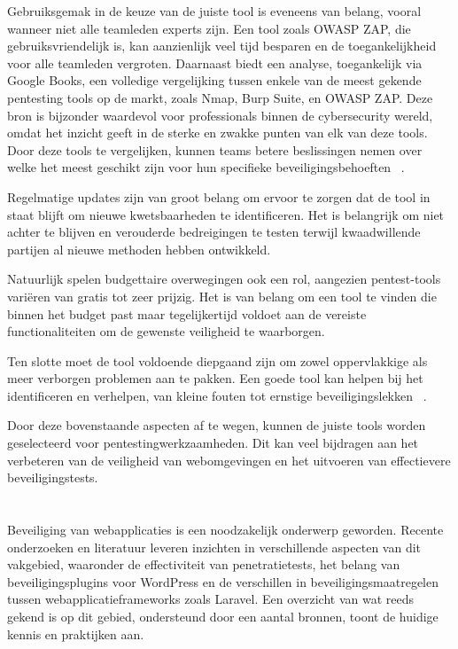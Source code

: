 Gebruiksgemak in de keuze van de juiste tool is eveneens van belang, vooral wanneer niet alle teamleden experts zijn. Een tool zoals OWASP ZAP, 
die gebruiksvriendelijk is, kan aanzienlijk veel tijd besparen en de toegankelijkheid voor alle teamleden vergroten.
Daarnaast biedt een analyse, toegankelijk via Google Books, een volledige vergelijking tussen enkele van de meest gekende pentesting tools op de markt, 
zoals Nmap, Burp Suite, en OWASP ZAP. Deze bron is bijzonder waardevol voor professionals binnen de cybersecurity wereld, omdat het inzicht geeft in de sterke en zwakke 
punten van elk van deze tools. Door deze tools te vergelijken, kunnen teams betere beslissingen nemen over welke het meest geschikt zijn 
voor hun specifieke beveiligingsbehoeften ~\autocite{Velu2022}.

Regelmatige updates zijn van groot belang om ervoor te zorgen dat de tool in staat blijft om nieuwe kwetsbaarheden te 
identificeren. Het is belangrijk om niet achter te blijven en verouderde bedreigingen te testen terwijl kwaadwillende 
partijen al nieuwe methoden hebben ontwikkeld.

Natuurlijk spelen budgettaire overwegingen ook een rol, aangezien pentest-tools variëren van gratis tot zeer prijzig. Het 
is van belang om een tool te vinden die binnen het budget past maar tegelijkertijd voldoet aan de vereiste functionaliteiten
om de gewenste veiligheid te waarborgen.

Ten slotte moet de tool voldoende diepgaand zijn om zowel oppervlakkige als meer verborgen problemen aan te pakken. 
Een goede tool kan helpen bij het identificeren en verhelpen, van kleine fouten tot ernstige beveiligingslekken
~\autocite{Maji2022}.

Door deze bovenstaande aspecten af te wegen, kunnen de juiste tools worden geselecteerd voor pentestingwerkzaamheden. 
Dit kan veel bijdragen aan het verbeteren van de veiligheid van webomgevingen en het uitvoeren van effectievere beveiligingstests.

\section{}
\label{sec:wat-weten-we-uit-de-literatuur}
Beveiliging van webapplicaties is een noodzakelijk onderwerp geworden. Recente onderzoeken en literatuur leveren 
inzichten in verschillende aspecten van dit vakgebied, waaronder de effectiviteit van penetratietests, het belang van beveiligingsplugins voor WordPress en de verschillen 
in beveiligingsmaatregelen tussen webapplicatieframeworks zoals Laravel. Een overzicht van wat reeds gekend is op dit gebied, ondersteund door een aantal 
bronnen, toont de huidige kennis en praktijken aan.


